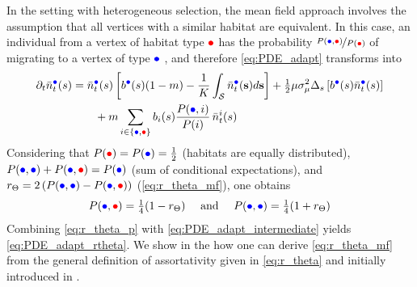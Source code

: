 %
In the setting with heterogeneous selection, the mean field approach involves the assumption that all vertices with a similar habitat are equivalent. In this case, an individual from a vertex of habitat type $\rcirc$ has the probability $\nicefrac{P({\bcirc},{\rcirc})}{P({\rcirc})}$ of migrating to a vertex of type $\bcirc$ , and therefore \cref{eq:PDE_adapt} transforms into
%
\begin{equation}
\begin{split}\label{eq:PDE_adapt_intermediate}
    \partial_t \bar{n}_t^{{\bcirc}}(s) &= \bar{n}_t^{{\bcirc}}(s)\left[b^{{\bcirc}}(s) (1-m) -  \frac{1}{K}\int_\mathcal{S}  \bar{n}_t^{{\bcirc}}({\textbf s}) d{\textbf s}  \right] + \tfrac{1}{2} \mu \sigma_\mu^2 \Delta_s \left[ b^{{\bcirc}}(s) \bar{n}_t^{{\bcirc}}(s)\right] \\
    & \qquad + m \sum_{{i} \in \{{\bcirc},{\rcirc}\}}  b_{i}(s) \frac{P({\bcirc},{i})}{P({i})} \, \bar{n}_t^{{i}}(s)
\end{split}
\end{equation}
%
Considering that $P({\rcirc}) = P({\bcirc}) = \tfrac{1}{2}$ (habitats are equally distributed), $P(\bcirc,\bcirc) + P(\bcirc,\rcirc) = P(\bcirc) $ (sum of conditional expectations), and $r_\Theta = 2 \left( P({\bcirc},{\bcirc}) - P({\bcirc},{\rcirc}) \right)$ (\cref{eq:r_theta_mf}), one obtains
\begin{equation}\label{eq:r_theta_p}
  P(\bcirc,\rcirc) = \tfrac{1}{4} (1 - r_\Theta) \quad \text{ and } \quad P(\bcirc,\bcirc) = \tfrac{1}{4} (1 + r_\Theta)
\end{equation} 
Combining \cref{eq:r_theta_p} with \cref{eq:PDE_adapt_intermediate} yields \cref{eq:PDE_adapt_rtheta}.
%
We show in the  how one can derive \cref{eq:r_theta_mf} from the general definition of assortativity given in \cref{eq:r_theta} and initially introduced in \citep{Newman2003a}.


